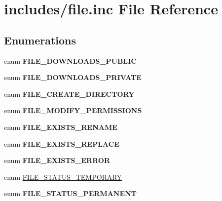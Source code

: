 \hypertarget{file_8inc}{
\section{includes/file.inc File Reference}
\label{file_8inc}
}
\subsection*{Enumerations}
\begin{CompactItemize}
\item 
enum \textbf{FILE\_\-DOWNLOADS\_\-PUBLIC} 
\item 
enum \textbf{FILE\_\-DOWNLOADS\_\-PRIVATE} 
\item 
enum \textbf{FILE\_\-CREATE\_\-DIRECTORY} 
\item 
enum \textbf{FILE\_\-MODIFY\_\-PERMISSIONS} 
\item 
enum \textbf{FILE\_\-EXISTS\_\-RENAME} 
\item 
enum \textbf{FILE\_\-EXISTS\_\-REPLACE} 
\item 
enum \textbf{FILE\_\-EXISTS\_\-ERROR} 
\item 
enum \hyperlink{group__file_g436af683744d1fefcd6da3d694633d19}{FILE\_\-STATUS\_\-TEMPORARY} 
\item 
enum \textbf{FILE\_\-STATUS\_\-PERMANENT} 
\end{CompactItemize}

